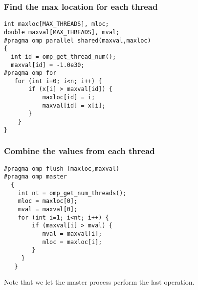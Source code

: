 \documentclass{beamer}
\begin{document}
\begin{frame}
\frametitle{Find the max location for each thread}

\begin{block}{}















\begin{verbatim}
int maxloc[MAX_THREADS], mloc;
double maxval[MAX_THREADS], mval; 
#pragma omp parallel shared(maxval,maxloc)
{
  int id = omp_get_thread_num(); 
  maxval[id] = -1.0e30;
#pragma omp for
   for (int i=0; i<n; i++) {
       if (x[i] > maxval[id]) { 
           maxloc[id] = i;
           maxval[id] = x[i]; 
       }
    }
}

\end{verbatim}

\end{block}
\end{frame}

\begin{frame}
\frametitle{Combine the values from each thread}

\begin{block}{}














\begin{verbatim}
#pragma omp flush (maxloc,maxval)
#pragma omp master
  {
    int nt = omp_get_num_threads(); 
    mloc = maxloc[0]; 
    mval = maxval[0]; 
    for (int i=1; i<nt; i++) {
        if (maxval[i] > mval) { 
           mval = maxval[i]; 
           mloc = maxloc[i];
        } 
     }
   }

\end{verbatim}

Note that we let the master process perform the last operation.
\end{block}
\end{frame}
\end{document}
